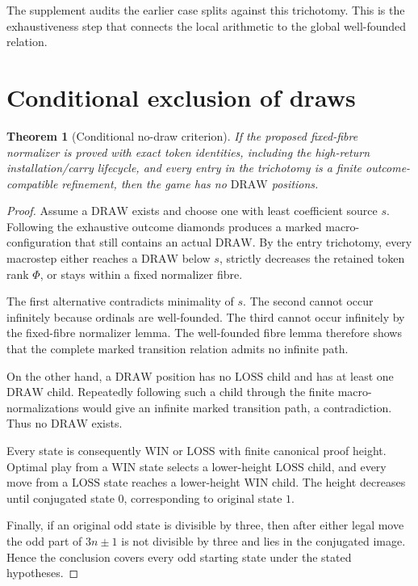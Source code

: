 \documentclass[11pt]{article}
\newtheorem{theorem}{Theorem}[section]
\newcommand{\WIN}{\mathrm{WIN}}
\newcommand{\LOSS}{\mathrm{LOSS}}
\newcommand{\DRAW}{\mathrm{DRAW}}
\begin{document}
The supplement audits the earlier case splits against this trichotomy. This is
the exhaustiveness step that connects the local arithmetic to the global
well-founded relation.

\section{Conditional exclusion of draws}

\begin{theorem}[Conditional no-draw criterion]
If the proposed fixed-fibre normalizer is proved with exact token identities,
including the high-return installation/carry lifecycle, and every entry in the trichotomy is a
finite outcome-compatible refinement, then the game has no $\DRAW$ positions.
\end{theorem}

\begin{proof}
Assume a $\DRAW$ exists and choose one with least coefficient source $s$.
Following the exhaustive outcome diamonds produces a marked macro-configuration
that still contains an actual $\DRAW$. By the entry trichotomy, every
macrostep either reaches a $\DRAW$ below $s$, strictly decreases the retained
token rank $\Phi$, or stays within a fixed normalizer fibre.

The first alternative contradicts minimality of $s$. The second cannot occur
infinitely because ordinals are well-founded. The third cannot occur
infinitely by the fixed-fibre normalizer lemma. The well-founded fibre lemma
therefore shows that the complete marked transition relation admits no
infinite path.

On the other hand, a $\DRAW$ position has no $\LOSS$ child and has at least one
$\DRAW$ child. Repeatedly following such a child through the finite
macro-normalizations would give an infinite marked transition path, a
contradiction. Thus no $\DRAW$ exists.

Every state is consequently $\WIN$ or $\LOSS$ with finite canonical proof
height. Optimal play from a $\WIN$ state selects a lower-height $\LOSS$ child,
and every move from a $\LOSS$ state reaches a lower-height $\WIN$ child. The
height decreases until conjugated state $0$, corresponding to original state
$1$.

Finally, if an original odd state is divisible by three, then after either
legal move the odd part of $3n\pm1$ is not divisible by three and lies in the
conjugated image. Hence the conclusion covers every odd starting state under
the stated hypotheses.
\end{proof}
\end{document}
